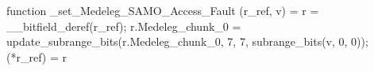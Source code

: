 function _set_Medeleg_SAMO_Access_Fault (r_ref, v) = {
    r = __bitfield_deref(r_ref);
    r.Medeleg_chunk_0 = update_subrange_bits(r.Medeleg_chunk_0, 7, 7, subrange_bits(v, 0, 0));
    (*r_ref) = r
}
